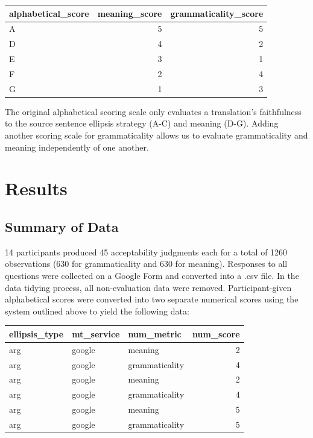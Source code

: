 \documentclass[
  man,floatsintext]{apa6}
\begin{document}
\begin{tabular}{l|r|r}
\hline
alphabetical\_score & meaning\_score & grammaticality\_score\\
\hline
A & 5 & 5\\
\hline
D & 4 & 2\\
\hline
E & 3 & 1\\
\hline
F & 2 & 4\\
\hline
G & 1 & 3\\
\hline
\end{tabular}

The original alphabetical scoring scale only evaluates a translation's faithfulness to the source sentence ellipsis strategy (A-C) and meaning (D-G). Adding another scoring scale for grammaticality allows us to evaluate grammaticality and meaning independently of one another.

\hypertarget{results}{%
\section{Results}\label{results}}

\hypertarget{summary-of-data}{%
\subsection{Summary of Data}\label{summary-of-data}}

14 participants produced 45 acceptability judgments each for a total of 1260 observations (630 for grammaticality and 630 for meaning). Responses to all questions were collected on a Google Form and converted into a .csv file. In the data tidying process, all non-evaluation data were removed. Participant-given alphabetical scores were converted into two separate numerical scores using the system outlined above to yield the following data:

\begin{tabular}{l|l|l|r}
\hline
ellipsis\_type & mt\_service & num\_metric & num\_score\\
\hline
arg & google & meaning & 2\\
\hline
arg & google & grammaticality & 4\\
\hline
arg & google & meaning & 2\\
\hline
arg & google & grammaticality & 4\\
\hline
arg & google & meaning & 5\\
\hline
arg & google & grammaticality & 5\\
\hline
\end{tabular}
\end{document}
